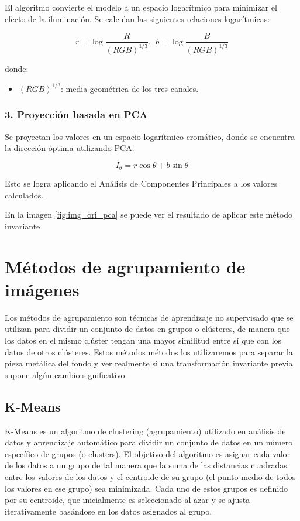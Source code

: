 El algoritmo convierte el modelo a un espacio logarítmico para minimizar el efecto de la iluminación. Se calculan las siguientes relaciones logarítmicas:

$$r=\log \frac{R}{(RGB)^{1/3} },~~b=\log \frac{B}{(RGB)^{1/3} }$$

donde:

\begin{itemize}
\setlength{\itemsep}{-1ex}
   \item{\begin{flushleft} $(RGB)^{1/3}$: media geométrica de los tres canales. \end{flushleft}}
\end{itemize}

\subsubsection{3. Proyección basada en PCA}

Se proyectan los valores en un espacio logarítmico-cromático, donde se encuentra la dirección óptima utilizando PCA:

$$I_{\theta } =r\cos \theta +b\sin \theta$$

Esto se logra aplicando el Análisis de Componentes Principales a los valores calculados.

En la imagen \ref{fig:img_ori_pca} se puede ver el resultado de aplicar este método invariante

\section{Métodos de agrupamiento de imágenes}\label{metodos-de-agrupamiento-de-imagenes}

Los métodos de agrupamiento son técnicas de aprendizaje no supervisado que se utilizan para dividir un conjunto de datos en grupos o clústeres, de manera que los datos en el mismo clúster tengan una mayor similitud entre sí que con los datos de otros clústeres. Estos métodos métodos los utilizaremos para separar la pieza metálica del fondo y ver realmente si una transformación invariante previa supone algún cambio significativo.

\subsection{K-Means}\label{k-means}

K-Means \cite{MATLAB:2023bKmeans} es un algoritmo de clustering (agrupamiento) utilizado en análisis de datos y aprendizaje automático para dividir un conjunto de datos en un número específico de grupos (o clusters). El objetivo del algoritmo es asignar cada valor de los datos a un grupo de tal manera que la suma de las distancias cuadradas entre los valores de los datos y el centroide de su grupo (el punto medio de todos los valores en ese grupo) sea minimizada. Cada uno de estos grupos es definido por su centroide, que inicialmente es seleccionado al azar y se ajusta iterativamente basándose en los datos asignados al grupo.

